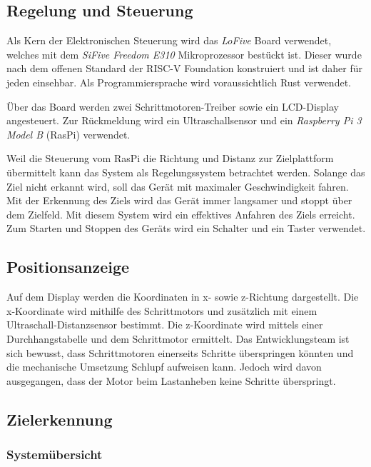 \documentclass[a4paper]{report}
\begin{document}
\subsection{Regelung und Steuerung}

Als Kern der Elektronischen Steuerung wird das \textit{LoFive} Board verwendet, welches mit dem \textit{SiFive Freedom E310} Mikroprozessor bestückt ist. Dieser wurde nach dem offenen Standard der RISC-V Foundation konstruiert und ist daher für jeden einsehbar. Als Programmiersprache wird voraussichtlich Rust verwendet.

Über das Board werden zwei Schrittmotoren-Treiber sowie ein LCD-Display angesteuert. Zur Rückmeldung wird ein Ultraschallsensor und ein \textit{Raspberry Pi 3 Model B} (RasPi) verwendet.

Weil die Steuerung vom RasPi die Richtung und Distanz zur Zielplattform übermittelt kann das System als Regelungssystem betrachtet werden. Solange das Ziel nicht erkannt wird, soll das Gerät mit maximaler Geschwindigkeit fahren. Mit der Erkennung des Ziels wird das Gerät immer langsamer und stoppt über dem Zielfeld. Mit diesem System wird ein effektives Anfahren des Ziels erreicht. Zum Starten und Stoppen des Geräts wird ein Schalter und ein Taster verwendet.

\subsection{Positionsanzeige}

Auf dem Display werden die Koordinaten in x- sowie z-Richtung dargestellt. Die x-Koordinate wird mithilfe des Schrittmotors und zusätzlich mit einem Ultraschall-Distanzsensor bestimmt. Die z-Koordinate wird mittels einer Durchhangstabelle und dem Schrittmotor ermittelt. Das Entwicklungsteam ist sich bewusst, dass Schrittmotoren einerseits Schritte überspringen könnten und die mechanische Umsetzung Schlupf aufweisen kann. Jedoch wird davon ausgegangen, dass der Motor beim Lastanheben keine Schritte überspringt.

\newpage
\subsection{Zielerkennung}
\subsubsection{Systemübersicht}
\end{document}
